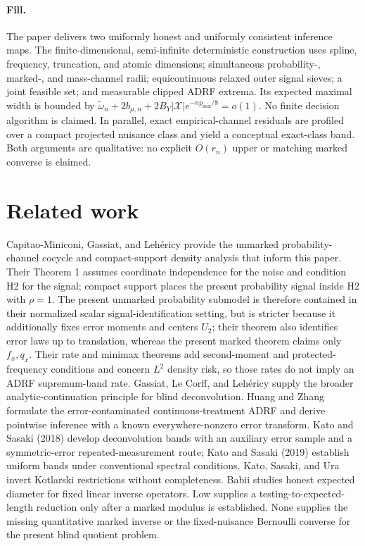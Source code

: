 \documentclass{article}
\begin{document}
\paragraph{Fill.} The paper delivers two uniformly honest and uniformly consistent inference maps. The finite-dimensional, semi-infinite deterministic construction uses spline, frequency, truncation, and atomic dimensions; simultaneous probability-, marked-, and mass-channel radii; equicontinuous relaxed outer signal sieves; a joint feasible set; and measurable clipped ADRF extrema. Its expected maximal width is bounded by \(\widetilde\omega_n+2b_{\mu,n}+2B_Y|\mathcal X|e^{-np_{\min}/8}=o(1)\). No finite decision algorithm is claimed. In parallel, exact empirical-channel residuals are profiled over a compact projected nuisance class and yield a conceptual exact-class band. Both arguments are qualitative: no explicit \(O(r_n)\) upper or matching marked converse is claimed.

\section{Related work}

Capitao-Miniconi, Gassiat, and Lehéricy provide the unmarked probability-channel cocycle and compact-support density analysis that inform this paper. Their Theorem 1 assumes coordinate independence for the noise and condition H2 for the signal; compact support places the present probability signal inside H2 with \(\rho=1\). The present unmarked probability submodel is therefore contained in their normalized scalar signal-identification setting, but is stricter because it additionally fixes error moments and centers \(U_2\); their theorem also identifies error laws up to translation, whereas the present marked theorem claims only \(f_x,q_x\). Their rate and minimax theorems add second-moment and protected-frequency conditions and concern \(L^2\) density risk, so those rates do not imply an ADRF supremum-band rate. Gassiat, Le Corff, and Lehéricy supply the broader analytic-continuation principle for blind deconvolution. Huang and Zhang formulate the error-contaminated continuous-treatment ADRF and derive pointwise inference with a known everywhere-nonzero error transform. Kato and Sasaki (2018) develop deconvolution bands with an auxiliary error sample and a symmetric-error repeated-measurement route; Kato and Sasaki (2019) establish uniform bands under conventional spectral conditions. Kato, Sasaki, and Ura invert Kotlarski restrictions without completeness. Babii studies honest expected diameter for fixed linear inverse operators. Low supplies a testing-to-expected-length reduction only after a marked modulus is established. None supplies the missing quantitative marked inverse or the fixed-nuisance Bernoulli converse for the present blind quotient problem.
\end{document}
